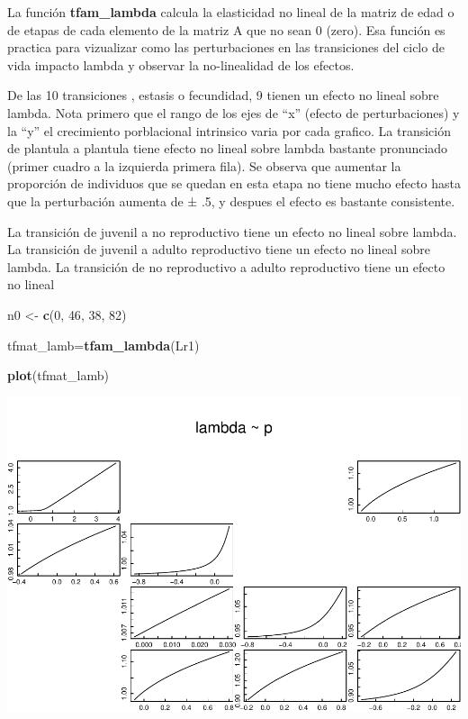 \documentclass[
]{book}
\newenvironment{Shaded}{\begin{snugshade}}{\end{snugshade}}
\newcommand{\DecValTok}[1]{\textcolor[rgb]{0.00,0.00,0.81}{#1}}
\newcommand{\FunctionTok}[1]{\textcolor[rgb]{0.13,0.29,0.53}{\textbf{#1}}}
\newcommand{\NormalTok}[1]{#1}
\newcommand{\OtherTok}[1]{\textcolor[rgb]{0.56,0.35,0.01}{#1}}
\theoremstyle{definition}
\theoremstyle{definition}
\theoremstyle{definition}
\theoremstyle{definition}
\theoremstyle{remark}
\begin{document}
La función \textbf{tfam\_lambda} calcula la elasticidad no lineal de la matriz de edad o de etapas de cada elemento de la matriz A que no sean 0 (zero). Esa función es practica para vizualizar como las perturbaciones en las transiciones del ciclo de vida impacto lambda y observar la no-linealidad de los efectos.

De las 10 transiciones , estasis o fecundidad, 9 tienen un efecto no lineal sobre lambda. Nota primero que el rango de los ejes de ``x'' (efecto de perturbaciones) y la ``y'' el crecimiento porblacional intrinsico varia por cada grafico. La transición de plantula a plantula tiene efecto no lineal sobre lambda bastante pronunciado (primer cuadro a la izquierda primera fila). Se observa que aumentar la proporción de individuos que se quedan en esta etapa no tiene mucho efecto hasta que la perturbación aumenta de ± .5, y despues el efecto es bastante consistente.

La transición de juvenil a no reproductivo tiene un efecto no lineal sobre lambda. La transición de juvenil a adulto reproductivo tiene un efecto no lineal sobre lambda. La transición de no reproductivo a adulto reproductivo tiene un efecto no lineal

\begin{Shaded}
\begin{Highlighting}[]
\NormalTok{n0 }\OtherTok{\textless{}{-}} \FunctionTok{c}\NormalTok{(}\DecValTok{0}\NormalTok{, }\DecValTok{46}\NormalTok{, }\DecValTok{38}\NormalTok{, }\DecValTok{82}\NormalTok{)}

\NormalTok{tfmat\_lamb}\OtherTok{=}\FunctionTok{tfam\_lambda}\NormalTok{(Lr1)}

\FunctionTok{plot}\NormalTok{(tfmat\_lamb)}
\end{Highlighting}
\end{Shaded}

\includegraphics{Diagnostico_Poblacional_files/figure-latex/unnamed-chunk-20-1.pdf}
\end{document}
